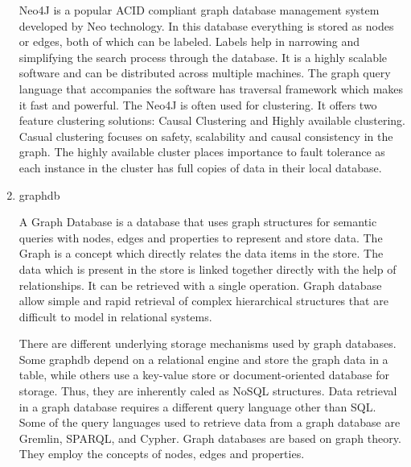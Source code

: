 \begin{enumerate}
Neo4J \label{\detokenize{i524/technologies:id449}}{\hyperref[\detokenize{i524/technologies:www-wiki-neo4j}]{\sphinxcrossref{{[}383{]}}}} is a popular ACID compliant graph
database management system developed by Neo technology. In this
database everything is stored as nodes or edges, both of which
can be labeled. Labels help in narrowing and simplifying the
search process through the database. \label{\detokenize{i524/technologies:id450}}{\hyperref[\detokenize{i524/technologies:www-slideshare}]{\sphinxcrossref{{[}384{]}}}} It is
a highly scalable software and can be distributed across multiple
machines.  The graph query language that accompanies the software
has traversal framework which makes it fast and
powerful. \label{\detokenize{i524/technologies:id451}}{\hyperref[\detokenize{i524/technologies:www-neo4j}]{\sphinxcrossref{{[}385{]}}}} The Neo4J is often used for
clustering. It offers two feature clustering solutions: Causal
Clustering and Highly available
clustering. \label{\detokenize{i524/technologies:id452}}{\hyperref[\detokenize{i524/technologies:www-neo4j-causal-cluster}]{\sphinxcrossref{{[}386{]}}}} Casual clustering
focuses on safety, scalability and causal consistency in the
graph. \label{\detokenize{i524/technologies:id453}}{\hyperref[\detokenize{i524/technologies:www-neo4j-ha-cluster}]{\sphinxcrossref{{[}387{]}}}} The highly available cluster
places importance to fault tolerance as each instance in the
cluster has full copies of data in their local database.

\item {} 
graphdb

A Graph Database is a database that uses graph structures for
semantic queries with nodes, edges and properties to represent
and store data.  \label{\detokenize{i524/technologies:id454}}{\hyperref[\detokenize{i524/technologies:www-graphdb}]{\sphinxcrossref{{[}388{]}}}} The Graph is a concept which
directly relates the data items in the store.  The data which is
present in the store is linked together directly with the help of
relationships. It can be retrieved with a single operation.
Graph database allow simple and rapid retrieval of complex
hierarchical structures that are difficult to model in relational
systems.

There are different underlying storage mechanisms used by graph
databases.  Some graphdb depend on a relational engine and store
the graph data in a table, while others use a key-value store or
document-oriented database for storage. Thus, they are inherently
caled as NoSQL structures.  Data retrieval in a graph database
requires a different query language other than SQL. Some of the
query languages used to retrieve data from a graph database are
Gremlin, SPARQL, and Cypher.  Graph databases are based on graph
theory. They employ the concepts of nodes, edges and properties.


\end{enumerate}
